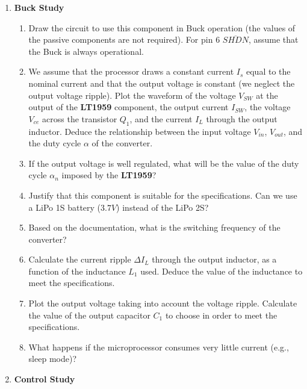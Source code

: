 \begin{enumerate}

\item \textbf{Buck Study}

\begin{enumerate}

\item Draw the circuit to use this component in Buck operation (the values of the passive components are not required). For pin 6 $\overline{SHDN}$, assume that the Buck is always operational.

\item We assume that the processor draws a constant current $I_s$ equal to the nominal current and that the output voltage is constant (we neglect the output voltage ripple). Plot the waveform of the voltage $V_{SW}$ at the output of the \textbf{LT1959} component, the output current $I_{SW}$, the voltage $V_{ce}$ across the transistor $Q_1$, and the current $I_{L}$ through the output inductor. Deduce the relationship between the input voltage $V_{in}$, $V_{out}$, and the duty cycle $\alpha$ of the converter.

\item If the output voltage is well regulated, what will be the value of the duty cycle $\alpha_n$ imposed by the \textbf{LT1959}?

\item Justify that this component is suitable for the specifications. Can we use a LiPo 1S battery ($3.7 V$) instead of the LiPo 2S?

\item Based on the documentation, what is the switching frequency of the converter?

\item Calculate the current ripple $\Delta I_{L}$ through the output inductor, as a function of the inductance $L_1$ used. Deduce the value of the inductance to meet the specifications.

\item Plot the output voltage taking into account the voltage ripple. Calculate the value of the output capacitor $C_1$ to choose in order to meet the specifications.

\item What happens if the microprocessor consumes very little current (e.g., sleep mode)?

\end{enumerate}

\item \textbf{Control Study}


\end{enumerate}
